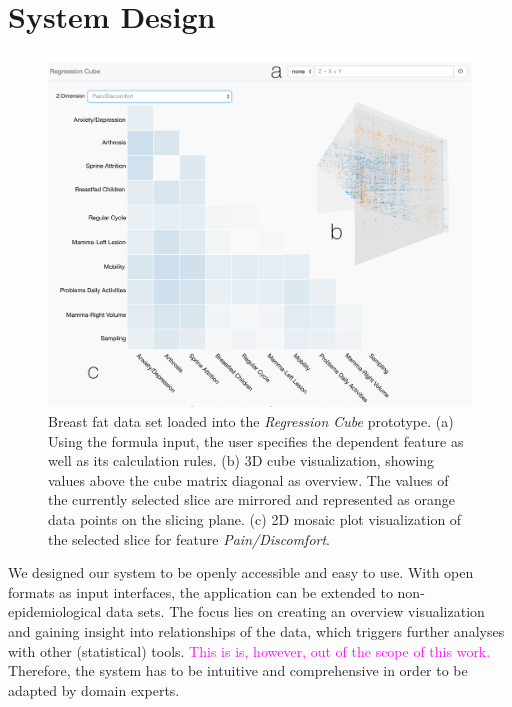 \documentclass[journal]{style/vgtc} 			          %
\newcommand{\magenta}[1]{\textcolor{magenta}{#1}}
\begin{document}
\section{System Design} \label{sec:SystemDesign}
\begin{figure}[htb]
 \centering
 \includegraphics[width=1.0\linewidth]{figures/system}
 \caption{
 Breast fat data set loaded into the \emph{Regression Cube} prototype.
 (a) Using the formula input, the user specifies the dependent feature as well as its calculation rules.
 (b) 3D cube visualization, showing values above the cube matrix diagonal as overview.
 The values of the currently selected slice are mirrored and represented as orange data points on the slicing plane.
 (c) 2D mosaic plot visualization of the selected slice for feature \emph{Pain/Discomfort}.
 }
  \label{fig:System}
\end{figure}
We designed our system to be openly accessible and easy to use.
With open formats as input interfaces, the application can be extended to non-epidemiological data sets.
The focus lies on creating an overview visualization and gaining insight into relationships of the data, which triggers further analyses with other (statistical) tools.
\magenta{This is is, however, out of the scope of this work.}
Therefore, the system has to be intuitive and comprehensive in order to be adapted by domain experts.
\\\\
\end{document}
